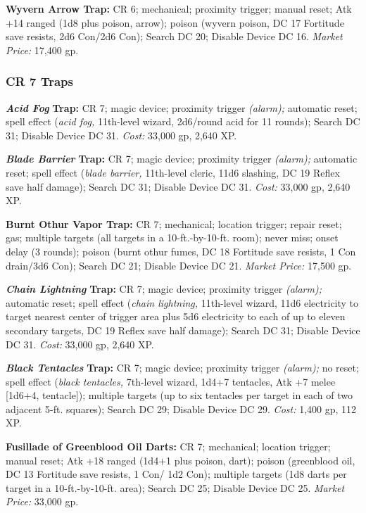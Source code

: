\documentclass{article}
\begin{document}
\textbf{Wyvern Arrow Trap: }CR 6; mechanical; proximity trigger; manual reset; 
Atk +14 ranged (1d8 plus poison, arrow); poison (wyvern poison, DC 17 Fortitude 
save resists, 2d6 Con/2d6 Con); Search DC 20; Disable Device DC 16. \textit{Market 
Price: }17,400 gp. 

\vspace{12pt}
\subsubsection*{\textbf{CR 7 Traps}}

\textit{\textbf{Acid Fog }}\textbf{Trap: }CR 7; magic device; proximity trigger 
\textit{(alarm); }automatic reset; spell effect (\textit{acid fog, }11th-level 
wizard, 2d6/round acid for 11 rounds); Search DC 31; Disable Device DC 31. \textit{Cost: 
}33,000 gp, 2,640 XP.

\textit{\textbf{Blade Barrier }}\textbf{Trap: }CR 7; magic device; proximity trigger 
\textit{(alarm); }automatic reset; spell effect (\textit{blade barrier, }11th-level 
cleric, 11d6 slashing, DC 19 Reflex save half damage); Search DC 31; Disable Device 
DC 31. \textit{Cost: }33,000 gp, 2,640 XP.

\textbf{Burnt Othur Vapor Trap: }CR 7; mechanical; location trigger; repair reset; 
gas; multiple targets (all targets in a 10-ft.-by-10-ft. room); never miss; onset 
delay (3 rounds); poison (burnt othur fumes, DC 18 Fortitude save resists, 1 Con 
drain/3d6 Con); Search DC 21; Disable Device DC 21. \textit{Market Price: }17,500 
gp.

\textit{\textbf{Chain Lightning }}\textbf{Trap: }CR 7; magic device; proximity 
trigger \textit{(alarm); }automatic reset; spell effect (\textit{chain lightning, 
}11th-level wizard, 11d6 electricity to target nearest center of trigger area plus 
5d6 electricity to each of up to eleven secondary targets, DC 19 Reflex save half 
damage); Search DC 31; Disable Device DC 31. \textit{Cost: }33,000 gp, 2,640 XP. 

\textit{\textbf{Black Tentacles }}\textbf{Trap: }CR 7; magic device; proximity 
trigger \textit{(alarm); }no reset; spell effect (\textit{black tentacles, }7th-level 
wizard, 1d4+7 tentacles, Atk +7 melee [1d6+4, tentacle]); multiple targets (up 
to six tentacles per target in each of two adjacent 5-ft. squares); Search DC 29; 
Disable Device DC 29. \textit{Cost: }1,400 gp, 112 XP.

\textbf{Fusillade of Greenblood Oil Darts:} CR 7; mechanical; location trigger; 
manual reset; Atk +18 ranged (1d4+1 plus poison, dart); poison (greenblood oil, 
DC 13 Fortitude save resists, 1 Con/ 1d2 Con); multiple targets (1d8 darts per 
target in a 10-ft.-by-10-ft. area); Search DC 25; Disable Device DC 25. \textit{Market 
Price: }33,000 gp.
\end{document}
